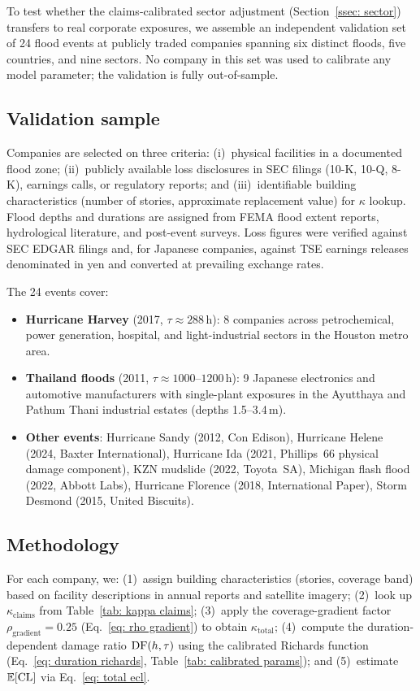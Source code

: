 To test whether the claims-calibrated sector adjustment (Section~\ref{ssec: sector}) transfers to real corporate exposures, we assemble an independent validation set of 24 flood events at publicly traded companies spanning six distinct floods, five countries, and nine sectors. No company in this set was used to calibrate any model parameter; the validation is fully out-of-sample.

\subsection{Validation sample}

Companies are selected on three criteria: (i)~physical facilities in a documented flood zone; (ii)~publicly available loss disclosures in SEC filings (10-K, 10-Q, 8-K), earnings calls, or regulatory reports; and (iii)~identifiable building characteristics (number of stories, approximate replacement value) for $\kappa$ lookup. Flood depths and durations are assigned from FEMA flood extent reports, hydrological literature, and post-event surveys. Loss figures were verified against SEC EDGAR filings and, for Japanese companies, against TSE earnings releases denominated in yen and converted at prevailing exchange rates.

The 24 events cover:
\begin{itemize}
    \item \textbf{Hurricane Harvey} (2017, $\tau \approx 288$\,h): 8 companies across petrochemical, power generation, hospital, and light-industrial sectors in the Houston metro area.
    \item \textbf{Thailand floods} (2011, $\tau \approx 1000$--$1200$\,h): 9 Japanese electronics and automotive manufacturers with single-plant exposures in the Ayutthaya and Pathum Thani industrial estates (depths 1.5--3.4\,m).
    \item \textbf{Other events}: Hurricane Sandy (2012, Con Edison), Hurricane Helene (2024, Baxter International), Hurricane Ida (2021, Phillips~66 physical damage component), KZN mudslide (2022, Toyota~SA), Michigan flash flood (2022, Abbott Labs), Hurricane Florence (2018, International Paper), Storm Desmond (2015, United Biscuits).
\end{itemize}

\subsection{Methodology}

For each company, we: (1)~assign building characteristics (stories, coverage band) based on facility descriptions in annual reports and satellite imagery; (2)~look up $\kappa_{\text{claims}}$ from Table~\ref{tab: kappa claims}; (3)~apply the coverage-gradient factor $\rho_{\text{gradient}} = 0.25$ (Eq.~\ref{eq: rho gradient}) to obtain $\kappa_{\text{total}}$; (4)~compute the duration-dependent damage ratio $\text{DF}(h,\tau)$ using the calibrated Richards function (Eq.~\ref{eq: duration richards}, Table~\ref{tab: calibrated params}); and (5)~estimate $\mathbb{E}[\text{CL}]$ via Eq.~\ref{eq: total ecl}.

